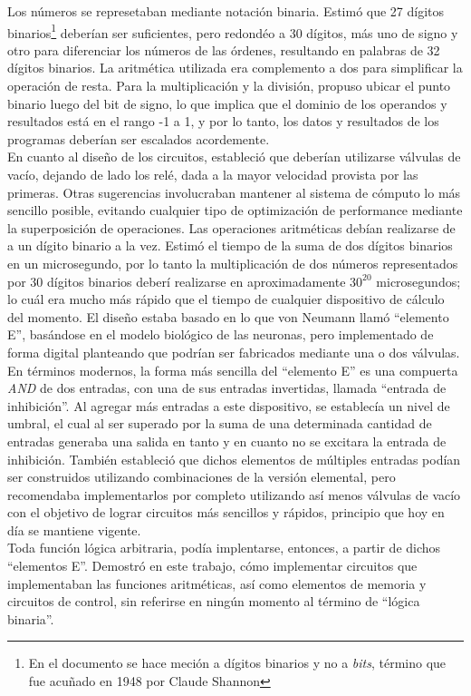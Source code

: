 Los números se represetaban mediante notación binaria. Estimó que 27 dígitos binarios\footnote{En el documento se hace meción a dígitos binarios y no a \emph{bits}, término que fue acuñado en 1948 por Claude Shannon} deberían ser suficientes, pero redondéo a 30 dígitos, más uno de signo y otro para diferenciar los números de las órdenes, resultando en palabras de 32 dígitos binarios. La aritmética utilizada era complemento a dos para simplificar la operación de resta. Para la multiplicación y la división, propuso ubicar el punto binario luego del bit de signo, lo que implica que el dominio de los operandos y resultados está en el rango -1 a 1, y por lo tanto, los datos y resultados de los programas deberían ser escalados acordemente.\\
En cuanto al diseño de los circuitos, estableció que deberían utilizarse válvulas de vacío, dejando de lado los relé, dada a la mayor velocidad provista por las primeras. Otras sugerencias involucraban mantener al sistema de cómputo lo más sencillo posible, evitando cualquier tipo de optimización de performance mediante la superposición de operaciones. Las operaciones aritméticas debían realizarse de a un dígito binario a la vez. Estimó el tiempo de la suma de dos dígitos binarios en un microsegundo, por lo tanto la multiplicación de dos números representados por 30 dígitos binarios deberí realizarse en aproximadamente $30^{20}$ microsegundos; lo cuál era mucho más rápido que el tiempo de cualquier dispositivo de cálculo del momento. El diseño estaba basado en lo que von Neumann llamó ``elemento E'', basándose en el modelo biológico de las neuronas, pero implementado de forma digital planteando que podrían ser fabricados mediante una o dos válvulas. En términos modernos, la forma más sencilla del ``elemento E'' es una compuerta \emph{AND} de dos entradas, con una de sus entradas invertidas, llamada ``entrada de inhibición''. Al agregar más entradas a este dispositivo, se establecía un nivel de umbral, el cual al ser superado por la suma de una determinada cantidad de entradas generaba una salida en tanto y en cuanto no se excitara la entrada de inhibición. También estableció que dichos elementos de múltiples entradas podían ser construidos utilizando combinaciones de la versión elemental, pero recomendaba implementarlos por completo utilizando así menos válvulas de vacío con el objetivo de lograr circuitos más sencillos y rápidos, principio que hoy en día se mantiene vigente.\\
Toda función lógica arbitraria, podía implentarse, entonces, a partir de dichos ``elementos E''. Demostró en este trabajo, cómo implementar circuitos que implementaban las funciones aritméticas, así como elementos de memoria y circuitos de control, sin referirse en ningún momento al término de ``lógica binaria''.\\
